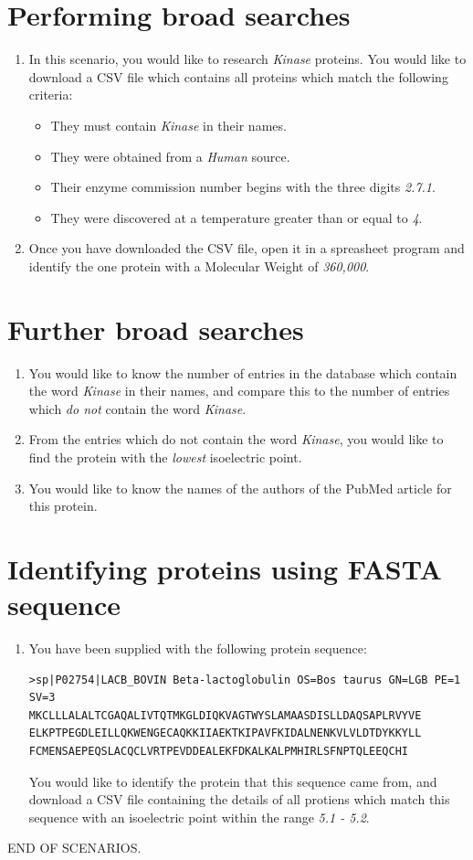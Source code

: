 \documentclass[12pt,twoside]{report}
\begin{document}
\section{Performing broad searches}
\begin{enumerate}
\item In this scenario, you would like to research \textit{Kinase}
  proteins. You would like to download a CSV file which contains all
  proteins which match the following criteria:
  \begin{itemize}
  \item They must contain \textit{Kinase} in their names.
  \item They were obtained from a \textit{Human} source.
  \item Their enzyme commission number begins with the three digits
    \textit{2.7.1}.
  \item They were discovered at a temperature greater than or equal to \textit{4\celsius}.
  \end{itemize}
\item Once you have downloaded the CSV file, open it in a spreasheet
  program and identify the one protein with a Molecular Weight of
  \textit{360,000}.
\end{enumerate}

\section{Further broad searches}
\begin{enumerate}
\item You would like to know the number of entries in the database
  which contain the word \textit{Kinase} in their names, and compare
  this to the number of entries which \textit{do not} contain the word
  \textit{Kinase}.
\item From the entries which do not contain the word \textit{Kinase},
  you would like to find the protein with the \textit{lowest}
  isoelectric point.
\item You would like to know the names of the authors of the PubMed
  article for this protein.
\end{enumerate}

\newpage
\section{Identifying proteins using FASTA sequence}
\begin{enumerate}
\item You have been supplied with the following protein sequence:
\begin{verbatim}
>sp|P02754|LACB_BOVIN Beta-lactoglobulin OS=Bos taurus GN=LGB PE=1 SV=3
MKCLLLALALTCGAQALIVTQTMKGLDIQKVAGTWYSLAMAASDISLLDAQSAPLRVYVE
ELKPTPEGDLEILLQKWENGECAQKKIIAEKTKIPAVFKIDALNENKVLVLDTDYKKYLL
FCMENSAEPEQSLACQCLVRTPEVDDEALEKFDKALKALPMHIRLSFNPTQLEEQCHI
\end{verbatim}

You would like to identify the protein that this sequence came from,
and download a CSV file containing the details of all protiens which
match this sequence with an isoelectric point within the range
\textit{5.1 - 5.2}.
\end{enumerate}

{\centering END OF SCENARIOS.\par}
\end{document}
